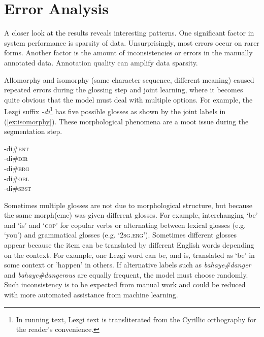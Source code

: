 \section{Error Analysis}
\label{sec:errors}

A closer look at the results reveals interesting patterns. One significant factor in system performance is sparsity of data. Unsurprisingly, most errors occur on rarer forms. 
Another factor is the amount of inconsistencies or errors in the manually annotated data. Annotation quality can amplify data sparsity. 

Allomorphy and isomorphy (same character sequence, different meaning) caused repeated errors during the glossing step and joint learning, where it becomes quite obvious that the model must deal with multiple options. For example, the Lezgi suffix \textit{-di}\footnote{In running text, Lezgi text is transliterated from the Cyrillic orthography for the reader's convenience.} has five possible glosses as shown by the joint labels in (\ref{ex:isomorphy}). These morphological phenomena are a moot issue during the segmentation step. 

\pex   
\label{ex:isomorphy}
-di\#\textsc{ent} \\
-di\#\textsc{dir} \\
-di\#\textsc{erg} \\
-di\#\textsc{obl} \\
-di\#\textsc{sbst} 
\xe

Sometimes multiple glosses are not due to morphological structure, but because the same morph(eme) was given different glosses. For example, interchanging `be' and `is' and `\textsc{cop}' for copular verbs or alternating between lexical glosses (e.g. `you') and grammatical glosses (e.g. `\textsc{2sg.erg}'). Sometimes different glosses appear because the item can be translated by different English words depending on the context. For example, one Lezgi word can be, and is, translated as `be' in some context or 'happen' in others. If alternative labels such as \textit{bahaye\#danger} and \textit{bahaye\#dangerous} are equally frequent, the model must choose randomly. Such inconsistency is to be expected from manual work and could be reduced with more automated assistance from machine learning.

